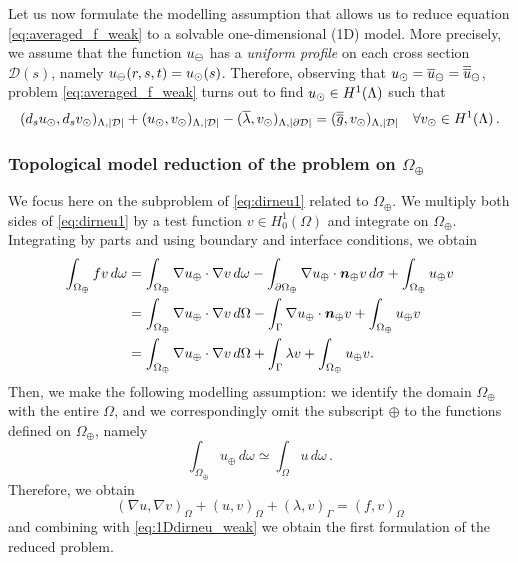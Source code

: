 Let us now formulate the modelling assumption that allows us to reduce equation \eqref{eq:averaged_f_weak} to a solvable one-dimensional (1D) model.
More precisely, we assume that the function $u_{\ominus}$ has a \emph{uniform profile} on each cross section $\mathcal{D}(s)$, namely $u_{\ominus}(r,s,t) = u_{\odot}(s)$.
Therefore, observing that $u_{\odot}=\overline{u}_{\ominus}=\overline{\overline{u}}_{\ominus}$, problem \eqref{eq:averaged_f_weak} turns out to find $u_{\odot} \in H^1(\Lambda)$ such that
\begin{equation}\label{eq:1Ddirneu_weak}
 (d_s \ud, d_s \vd)_{\Lambda,|\mathcal{D}|} 
+(\ud, \vd)_{\Lambda, |\D|}
-(\avrc{\lambda},\vd)_{\Lambda, |\DD|}
=  (\avrd{g},\vd)_{\Lambda, |\mathcal{D}|}
\quad \forall \vd \in H^1(\Lambda)\,.
\end{equation}

\subsubsection*{Topological model reduction of the problem on $\Omega_{\oplus}$}
We focus here on the subproblem of \eqref{eq:dirneu1} related to $\Omega_{\oplus}$.
We multiply both sides of \eqref{eq:dirneu1} by a test function $v\in H^1_0(\Omega)$ and integrate on $\Omega_\oplus$. Integrating by parts and using boundary and interface conditions, we obtain
\begin{equation*}
\begin{split}
\int_{\Omega _{\oplus}}fv\,d\omega&=
\int _{\Omega _{\oplus}}\nabla u_{\oplus} \cdot\nabla v\,d\omega -\int _{\partial \Omega _{\oplus}}\nabla u_{\oplus} \cdot \boldsymbol n_{\oplus} v\,d\sigma + \int_{\Omega_{\oplus}} u_{\oplus} v
\\
&=\int _{\Omega _{\oplus}}\nabla u_{\oplus} \cdot\nabla v\,d\Omega -\int_{\Gamma} \nabla u_{\oplus} \cdot \boldsymbol n_{\oplus} v + \int_{\Omega_{\oplus}} u_{\oplus} v
\\
&=\int _{\Omega _{\oplus}}\nabla u_{\oplus} \cdot\nabla v\,d\Omega +\int_{\Gamma} \lambda v + \int_{\Omega_{\oplus}} u_{\oplus} v.
\end{split}
\end{equation*} 
Then, we make the following modelling assumption:
we identify the domain $\Omega_{\oplus}$ with the entire $\Omega$, 
and we correspondingly omit the subscript $\oplus$ to the functions defined on $\Omega_{\oplus}$,
namely
\begin{equation*}
\int_{\Omega_{\oplus}} u_\oplus\, d\omega \simeq \int_{\Omega} u\, d\omega\,.
\end{equation*}
Therefore, we obtain 
\begin{equation*}
(\nabla u ,\nabla v)_{\Omega} +(u,v)_{\Omega}+(\lambda, v)_{\Gamma}  =(f,v)_{\Omega}
\end{equation*}
and combining with \eqref{eq:1Ddirneu_weak} we obtain the first formulation of the reduced problem.


